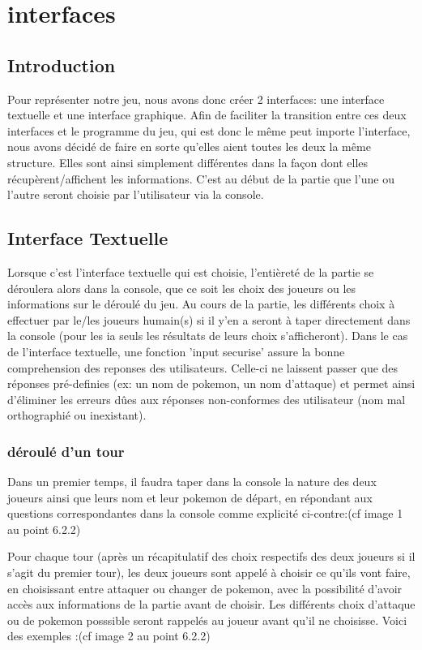 \section{interfaces}
    \subsection{Introduction}
        Pour représenter notre jeu, nous avons donc créer 2 interfaces: une interface textuelle et une interface graphique. Afin de faciliter la transition entre ces deux interfaces et le programme du jeu, qui est donc le même peut importe l'interface, nous avons décidé de faire en sorte qu'elles aient toutes les deux la même structure. Elles sont ainsi simplement différentes dans la façon dont elles récupèrent/affichent les informations. C'est au début de la partie que l'une ou l'autre seront choisie par l'utilisateur via la console.
    \subsection{Interface Textuelle}
        Lorsque c'est l'interface textuelle qui est choisie, l'entièreté de la partie se déroulera alors dans la console, que ce soit les choix des joueurs ou les informations sur le déroulé du jeu. Au cours de la partie, les différents choix à effectuer par le/les joueurs humain(s) si il y'en a seront à taper directement dans la console (pour les ia seuls les résultats de leurs choix s'afficheront).
        Dans le cas de l'interface textuelle, une fonction 'input securise' assure la bonne comprehension des reponses des utilisateurs. Celle-ci ne laissent passer que des réponses pré-definies (ex: un nom de pokemon, un nom d'attaque) et permet ainsi d'éliminer les erreurs dûes aux réponses non-conformes des utilisateur (nom mal orthographié ou inexistant).
        \bigskip
            \subsubsection{déroulé d'un tour}
                Dans un premier temps, il faudra taper dans la console la nature des deux joueurs ainsi que leurs nom et leur pokemon de départ, en répondant aux questions correspondantes dans la console comme explicité ci-contre:(cf image 1 au point 6.2.2)
                
                \bigskip
        
                Pour chaque tour (après un récapitulatif des choix respectifs des deux joueurs si il s'agit du premier tour), les deux joueurs sont appelé à choisir ce qu'ils vont faire, en choisissant entre attaquer ou changer de pokemon, avec la possibilité d'avoir accès aux informations de la partie avant de choisir. Les différents choix d'attaque ou de pokemon posssible seront rappelés au joueur avant qu'il ne choisisse. Voici des exemples :(cf image 2 au point 6.2.2)
    
